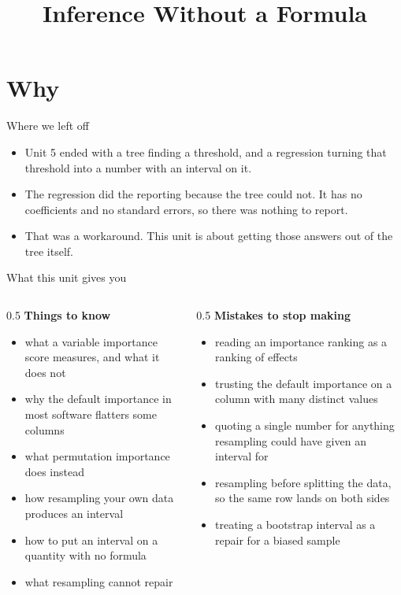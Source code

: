 \documentclass[aspectratio=169]{beamer}
\title{Inference Without a Formula}
\begin{document}
\begin{frame}
  \titlepage
\end{frame}

\section{Why}
\begin{frame}{Where we left off}
\begin{itemize}
  \item Unit 5 ended with a tree finding a threshold, and a regression turning that threshold into
        a number with an interval on it.
  \item The regression did the reporting because the tree could not. It has no coefficients and no
        standard errors, so there was nothing to report.
  \item That was a workaround. This unit is about getting those answers out of the tree itself.
\end{itemize}
\end{frame}

\begin{frame}{What this unit gives you}
\begin{columns}[T]
\begin{column}{0.5\textwidth}
\textbf{Things to know}
\begin{itemize}\small
  \item what a variable importance score measures, and what it does not
  \item why the default importance in most software flatters some columns
  \item what permutation importance does instead
  \item how resampling your own data produces an interval
  \item how to put an interval on a quantity with no formula
  \item what resampling cannot repair
\end{itemize}
\end{column}
\begin{column}{0.5\textwidth}
\textbf{Mistakes to stop making}
\begin{itemize}\small
  \item reading an importance ranking as a ranking of effects
  \item trusting the default importance on a column with many distinct values
  \item quoting a single number for anything resampling could have given an interval for
  \item resampling before splitting the data, so the same row lands on both sides
  \item treating a bootstrap interval as a repair for a biased sample
\end{itemize}
\end{column}
\end{columns}
\end{frame}
\end{document}

